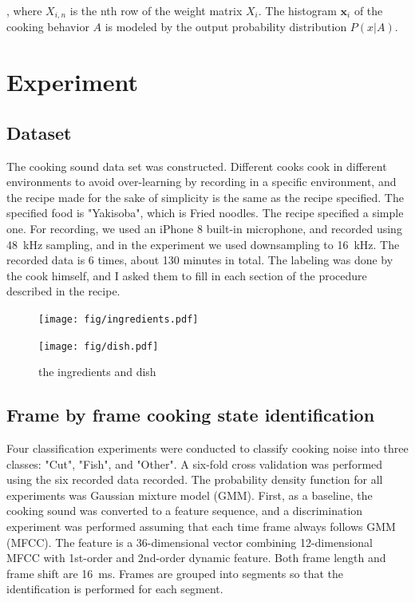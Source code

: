 \documentclass[sigconf,anonymous]{acmart}
\begin{document}
, where $ X_ {i, n} $ is the nth row of the weight matrix $ X_i $.
The histogram $ \bm {x} _i $ of the cooking behavior $ A $ is modeled by the output probability distribution $ P (x | A) $.

\section{Experiment}
\subsection{Dataset}
The cooking sound data set was constructed. Different cooks cook in different environments to avoid over-learning by recording in a specific environment, and the recipe made for the sake of simplicity is the same as the recipe specified.
The specified food is "Yakisoba", which is Fried noodles. The recipe specified a simple one.
For recording, we used an iPhone 8 built-in microphone, and recorded using \SI{48}{kHz} sampling, and in the experiment we used downsampling to \SI{16}{kHz}. The recorded data is 6 times, about 130 minutes in total.
The labeling was done by the cook himself, and I asked them to fill in each section of the procedure described in the recipe.

\begin{figure}[t]
  \centering
  \begin{minipage}{0.48\hsize}
    \centering
    \texttt{[image: fig/ingredients.pdf]}
  \end{minipage}
  \begin{minipage}{0.48\hsize}
    \centering
    \texttt{[image: fig/dish.pdf]}
  \end{minipage}
  \caption{the ingredients and dish}
  \Description{}
  \label{yakisoba}
\end{figure}


\subsection{Frame by frame cooking state identification}
Four classification experiments were conducted to classify cooking noise into three classes: "Cut", "Fish", and "Other". A six-fold cross validation was performed using the six recorded data recorded. The probability density function for all experiments was Gaussian mixture model (GMM).
First, as a baseline, the cooking sound was converted to a feature sequence, and a discrimination experiment was performed assuming that each time frame always follows GMM (MFCC).
The feature is a 36-dimensional vector combining 12-dimensional MFCC with 1st-order and 2nd-order dynamic feature. Both frame length and frame shift are \SI{16}{ms}. Frames are grouped into segments so that the identification is performed for each segment.
\end{document}
